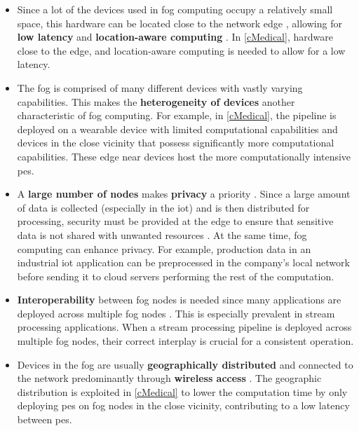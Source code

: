 \begin{itemize}
    \item Since a lot of the devices used in fog computing occupy a relatively small space, this hardware can be located close to the network edge \cite{Yousefpour.2019}, allowing for \textbf{low latency} and \textbf{location-aware computing} \cite{Bonomi.2012, Yigitoglu.2017}. In \ref{cMedical}, hardware close to the edge, and location-aware computing is needed to allow for a low latency.
    \item The fog is comprised of many different devices with vastly varying capabilities. This makes the \textbf{heterogeneity of devices} \cite{Bonomi.2012} another characteristic of fog computing. For example, in \ref{cMedical}, the pipeline is deployed on a wearable device with limited computational capabilities and devices in the close vicinity that possess significantly more computational capabilities. These edge near devices host the more computationally intensive \gls{pe}s.
    \item A \textbf{large number of nodes} makes \textbf{privacy} a priority \cite{Yigitoglu.2017}. Since a large amount of data is collected (especially in the \gls{iot}) and is then distributed for processing, security must be provided at the edge to ensure that sensitive data is not shared with unwanted resources \cite{Yigitoglu.2017}. At the same time, fog computing can enhance privacy. For example, production data in an industrial \gls{iot} application can be preprocessed in the company's local network before sending it to cloud servers performing the rest of the computation.
    \item \textbf{Interoperability} between fog nodes is needed since many applications are deployed across multiple fog nodes \cite{Bonomi.2012}. This is especially prevalent in stream processing applications. When a stream processing pipeline is deployed across multiple fog nodes, their correct interplay is crucial for a consistent operation.
    \item Devices in the fog are usually \textbf{geographically distributed} \cite{Bonomi.2012} and connected to the network predominantly through \textbf{wireless access} \cite{Osanaiye.2017, Bonomi.2012, Baccarelli.2018}. The geographic distribution is exploited in \ref{cMedical} to lower the computation time by only deploying \gls{pe}s on fog nodes in the close vicinity, contributing to a low latency between \gls{pe}s.
\end{itemize}

